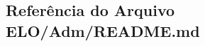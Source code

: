 \hypertarget{ELO_2Adm_2README_8md}{\subsection{Referência do Arquivo E\-L\-O/\-Adm/\-R\-E\-A\-D\-M\-E.md}
\label{ELO_2Adm_2README_8md}
}
